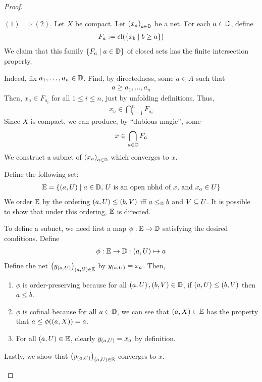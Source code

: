 \begin{proof}
\begin{description}
        \underline{$(1) \implies (2)$.}
        Let $X$ be compact. Let $\left( x_a \right)_{a \in \mathbb{D}}$ be a net. For each $a \in \mathbb{D}$, define
        \begin{align*}
            F_a := \operatorname{cl}\!\left( \left\{ x_b \; \middle\vert \; b \geq a \right\} \right)
        \end{align*}
        We claim that this family $\left\{ F_a \; \middle\vert \; a \in \mathbb{D} \right\}$ of closed sets has the finite intersection property.

        Indeed, fix $a_1, \ldots, a_n \in \mathbb{D}$. Find, by directedness, some $a \in A$ such that
        \begin{align*}
            a \geq a_1, \ldots, a_n
        \end{align*}
        Then, $x_a \in F_{a_i}$ for all $1 \leq i \leq n$, just by unfolding definitions. Thus,
        \begin{align*}
            x_a \in \bigcap_{i=1}^{n} F_{a_i}
        \end{align*}
        Since $X$ is compact, we can produce, by ``dubious magic'', some
        \begin{align*}
            x \in \bigcap_{a \in \mathbb{D}} F_a
        \end{align*}
        We construct a subnet of $\left( x_a \right)_{a \in \mathbb{D}}$ which converges to $x$.

        Define the following set:
        \begin{align*}
            \mathbb{E} = \left\{ \left( a, U \right) \; \middle\vert \; a \in \mathbb{D}\text{, } U \text{ is an open nbhd of $x$, and } x_a \in U \right\}
        \end{align*}
        We order $\mathbb{E}$ by the ordering $\left( a, U \right) \leq \left( b, V \right)$ iff $a \leq_{\mathbb{D}} b$ and $V \subseteq U$. It is possible to show that under this ordering, $\mathbb{E}$ is directed.

        To define a subnet, we need first a map $\phi : \mathbb{E} \to \mathbb{D}$ satisfying the desired conditions. Define
        \begin{align*}
            \phi : \mathbb{E} \to \mathbb{D} : \left( a, U \right) \mapsto a
        \end{align*}
        Define the net $\left( y_{\left( a, U \right)} \right)_{\left( a, U \right) \in \mathbb{E}}$ by $y_{\left( a, U \right)} = x_a$. Then,
        \begin{enumerate}
            \item $\phi$ is order-preserving because for all $\left( a, U \right), \left( b, V \right) \in \mathbb{D}$, if $\left( a, U \right) \leq \left( b, V \right)$ then $a \leq b$.
            \item $\phi$ is cofinal because for all $a \in \mathbb{D}$, we can see that $\left( a, X \right) \in \mathbb{E}$ has the property that $a \leq \phi\!\left( \left( a, X \right) \right) = a$.
            \item For all $\left( a, U \right) \in \mathbb{E}$, clearly $y_{\left( a, U \right)} = x_a$ by definition.
        \end{enumerate}
        Lastly, we show that $\left( y_{\left( a, U \right)} \right)_{\left( a, U \right) \in \mathbb{E}}$ converges to $x$.
        \sorry
    \end{description}
\end{proof}
